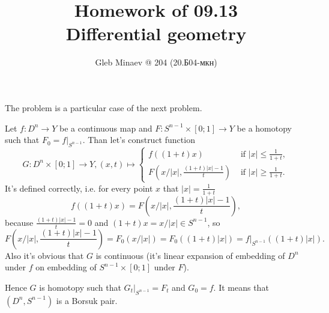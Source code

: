 \documentclass[12pt,a4paper]{article}
\title{Homework of 09.13\\Differential geometry}
\author{Gleb Minaev @ 204 (20.Б04-мкн)}
\date{}
\begin{document}
    \maketitle

    \setcounter{enumprb}{15}

    \begin{enumproblem}
        The problem is a particular case of the next problem.
    \end{enumproblem}

    \begin{enumproblem}
        Let $f: D^n \to Y$ be a continuous map and $F: S^{n-1} \times [0; 1] \to Y$ be a homotopy such that $F_0 = f|_{S^{n-1}}$. Than let's construct function
        \[
            G: D^n \times [0; 1] \to Y, (x, t) \mapsto
            \begin{cases}
                f((1+t)x)& \text{ if } |x| \leqslant \frac{1}{1+t},\\
                F(x/|x|, \frac{(1+t)|x| - 1}{t})& \text{ if } |x| \geqslant \frac{1}{1+t}.
            \end{cases}
        \]
        It's defined correctly, i.e. for every point $x$ that $|x| = \frac{1}{1+t}$
        \[f((1+t)x) = F(x/|x|, \frac{(1+t)|x| - 1}{t}),\]
        because $\frac{(1+t)|x| - 1}{t} = 0$ and $(1+t)x = x/|x| \in S^{n-1}$, so
        \[F(x/|x|, \frac{(1+t)|x| - 1}{t}) = F_0(x/|x|) = F_0((1+t)|x|) = f|_{S^{n-1}}((1+t)|x|).\]
        Also it's obvious that $G$ is continuous (it's linear expansion of embedding of $D^n$ under $f$ on embedding of $S^{n-1} \times [0; 1]$ under $F$).

        Hence $G$ is homotopy such that $G_t|_{S^{n-1}} = F_t$ and $G_0 = f$. It means that $(D^n, S^{n-1})$ is a Borsuk pair.
    \end{enumproblem}
\end{document}
